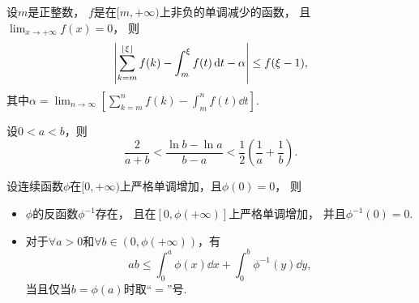\begin{corollary}
设\(m\)是正整数，
\(f\)是在\([m,+\infty)\)上非负的单调减少的函数，
且\(\lim_{x\to+\infty} f(x) = 0\)，
则\[
	\abs{
		\sum_{k=m}^{\lfloor\xi\rfloor} f(k)
		- \int_m^\xi f(t) \dd{t}
		- \alpha
	}
	\leq
	f(\xi-1),
\]
其中\(\alpha = \lim_{n\to\infty} \left[
	\sum_{k=m}^n f(k)
	- \int_m^n f(t) \dd{t}
\right]\).
\end{corollary}

\begin{proposition}
设\(0<a<b\)，则\begin{equation}
	\frac2{a+b}
	< \frac{\ln b - \ln a}{b - a}
	< \frac12 \left(\frac1a + \frac1b\right).
\end{equation}
\end{proposition}

\begin{proposition}
设连续函数\(\phi\)在\([0,+\infty)\)上严格单调增加，且\(\phi(0) = 0\)，
则\begin{itemize}
	\item \(\phi\)的反函数\(\phi^{-1}\)存在，
	且在\([0,\phi(+\infty)]\)上严格单调增加，
	并且\(\phi^{-1}(0) = 0\).

	\item 对于\(\forall a>0\)和\(\forall b\in(0,\phi(+\infty))\)，有\begin{equation}
		a b \leq \int_0^a \phi(x) \dd{x} + \int_0^b \phi^{-1}(y) \dd{y},
	\end{equation}
	当且仅当\(b = \phi(a)\)时取“\(=\)”号.
\end{itemize}
\end{proposition}
